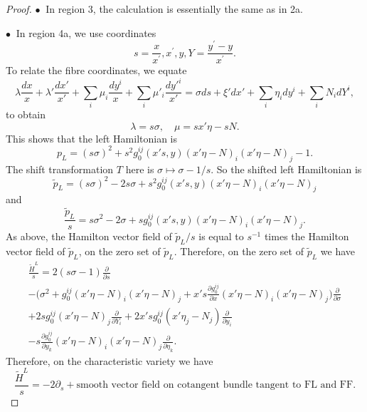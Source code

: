 \documentclass[10pt, a4paper, twoside]{amsart}
\numberwithin{equation}{section}
\theoremstyle{remark}
\begin{document}
\begin{proof}
$\bullet \ $ In region 3, the calculation is essentially the same as in 2a.

$\bullet \ $ In region 4a, we use coordinates
$$s = \frac{x}{x^\prime}, x^\prime, y, Y = \frac{y^\prime - y}{x^\prime}.
$$
To relate the fibre coordinates, we equate
$$
\lambda \frac{dx}{x} + \lambda' \frac{dx'}{x'} + \sum_i \mu_i \frac{dy^i}{x} + \sum_i \mu'_i \frac{{dy'}^i}{x'}=
\sigma ds + \xi' dx' + \sum_i \eta_i dy^i + \sum_i N_i dY^i,
$$
to obtain
$$
\lambda = s \sigma, \quad \mu = s x'\eta - sN .
$$
This shows that the left Hamiltonian is
\begin{equation}
p_L = (s\sigma)^2 + s^2 g_0^{ij}(x's, y) (x' \eta -  N)_i (x' \eta -  N)_j  - 1.
\label{lH-ff}\end{equation}
The shift transformation $T$ here is $\sigma \mapsto \sigma - 1/s$. So the shifted left Hamiltonian is
\begin{equation}
{\tilde p_L} = (s \sigma)^2 - 2 s \sigma + s^2 g_0^{ij}(x's, y) (x' \eta - N)_i (x' \eta - N)_j
\label{shifted-Ham-r4a} \end{equation}
and
\begin{equation}
\frac{\tilde p_L}{s} = s \sigma^2 - 2  \sigma + s g_0^{ij}(x's, y) (x' \eta - N)_i (x' \eta - N)_j.
\label{shifted-Ham-4aa} \end{equation}
As above, the Hamilton vector field of ${\tilde p_L}/s$ is equal to $s^{-1}$ times the Hamilton vector field of ${\tilde p_L}$, on the zero set of ${\tilde p_L}$.
Therefore, on the zero set of ${\tilde p_L}$ we have
\begin{equation}\begin{gathered}
\frac{\tilde H^L}{s}  = 2(s\sigma - 1) \frac{\partial}{\partial s}\\ - \Big(   \sigma^2  + g_0^{ij}(x' \eta - N)_i (x' \eta - N)_j+ x' s \frac{\partial g_0^{ij}}{\partial x}(x' \eta - N)_i (x' \eta - N)_j\Big) \frac{\partial}{\partial \sigma} \\ + 2s g_0^{ij}(x' \eta - N)_j \frac{\partial}{\partial Y_i} +  2x's  g_0^{ij} (x' \eta_j - N_j) \frac{\partial}{\partial y_i} \\ - s \frac{\partial g_0^{ij}}{\partial y_k}(x' \eta - N)_i (x' \eta - N)_j\frac{\partial}{\partial \eta_k}.
\end{gathered}\end{equation}
Therefore, on the characteristic variety we have
$$
\frac{\tilde H^L}{s} = - 2\partial_s + \text{smooth vector field on cotangent bundle tangent to ${\mathrm{FL}}$ and ${\mathrm{FF}}$.}$$


\end{proof}
\end{document}
